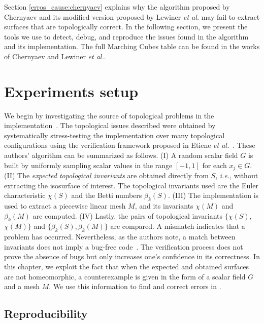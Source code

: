 Section \ref{erros_cause:chernyaev} explains why the algorithm proposed by Chernyaev and its modified version proposed by Lewiner \emph{et al.} may fail to extract surfaces that are topologically correct. In the following section, we present the tools we use to detect, debug, and reproduce the issues found in the \mc{} algorithm and its implementation. The full Marching Cubes table can be found in the works of Chernyaev \cite{Chernyaev95marchingcubes} and Lewiner \emph{et al.}\cite{Lewiner:2003}.


\section{Experiments setup}
\label{experiments_setup}

We begin by investigating the source of topological problems in the \mc{} implementation~\cite{Etiene:2012:TVI:2197070.2197097}.
%
The topological issues described were obtained by systematically stress-testing the implementation over many topological configurations using the verification framework proposed in Etiene \emph{et al.}~\cite{Etiene:2012:TVI:2197070.2197097}. These authors' algorithm can be summarized as follows.
%
(I) A random scalar field $G$ is built by uniformly sampling scalar values in the range $[-1,1]$ for each $x_j \in G$.
%
(II) The \emph{expected topological invariants} are obtained directly from $S$, {\em i.e.}, without extracting the isosurface of interest. The topological invariants used are the Euler characteristic $\chi(S)$ and the Betti numbers $\beta_k(S)$. 
%
(III) The \mc{} implementation is used to extract a piecewise linear mesh $M$, and its invariants $\chi(M)$ and $\beta_k(M)$ are computed.
%
(IV) Lastly, the pairs of topological invariants $\{\chi(S)$, $\chi(M)\}$ and $\{\beta_k(S), \beta_k(M)\}$ are compared. A mismatch indicates that a problem has occurred. Nevertheless,  as the authors note, a match between invariants does not imply a bug-free code~\cite{Etiene:2012:TVI:2197070.2197097}. The verification process does not prove the absence of bugs but only increases one's confidence in its correctness.
%
In this chapter, we exploit the fact that when the expected and obtained surfaces are not homeomorphic, a counterexample is given in the form of a scalar field $G$ and a mesh $M$. We use this information to find and correct errors in \mc{}.

\subsection{Reproducibility}

